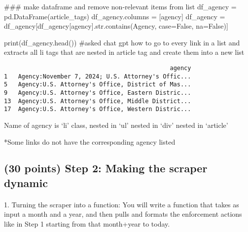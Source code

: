 \documentclass[
  letterpaper,
  DIV=11,
  numbers=noendperiod]{scrartcl}
\makeatletter
\let\oldparagraph\paragraph
\renewcommand{\paragraph}{
    \@ifstar
      \xxxParagraphStar
      \xxxParagraphNoStar
  }
\newcommand{\xxxParagraphStar}[1]{\oldparagraph*{#1}\mbox{}}
\newcommand{\xxxParagraphNoStar}[1]{\oldparagraph{#1}\mbox{}}
\newenvironment{Shaded}{\begin{snugshade}}{\end{snugshade}}
\newcommand{\BuiltInTok}[1]{\textcolor[rgb]{0.00,0.23,0.31}{#1}}
\newcommand{\CommentTok}[1]{\textcolor[rgb]{0.37,0.37,0.37}{#1}}
\newcommand{\NormalTok}[1]{\textcolor[rgb]{0.00,0.23,0.31}{#1}}
\newcommand{\OperatorTok}[1]{\textcolor[rgb]{0.37,0.37,0.37}{#1}}
\newcommand{\StringTok}[1]{\textcolor[rgb]{0.13,0.47,0.30}{#1}}
\newcommand{\VariableTok}[1]{\textcolor[rgb]{0.07,0.07,0.07}{#1}}
\makeatother
\begin{document}
\begin{Shaded}
\begin{Highlighting}[]
\CommentTok{\#\#\# make dataframe and remove non{-}relevant items from list}
\NormalTok{df\_agency }\OperatorTok{=}\NormalTok{ pd.DataFrame(article\_tags)}
\NormalTok{df\_agency.columns }\OperatorTok{=}\NormalTok{ [}\StringTok{\textquotesingle{}agency\textquotesingle{}}\NormalTok{]}
\NormalTok{df\_agency }\OperatorTok{=}\NormalTok{ df\_agency[df\_agency[}\StringTok{\textquotesingle{}agency\textquotesingle{}}\NormalTok{].}\BuiltInTok{str}\NormalTok{.contains(}\StringTok{\textquotesingle{}Agency\textquotesingle{}}\NormalTok{, case}\OperatorTok{=}\VariableTok{False}\NormalTok{, na}\OperatorTok{=}\VariableTok{False}\NormalTok{)]}

\BuiltInTok{print}\NormalTok{(df\_agency.head())}
\CommentTok{\#asked chat gpt \textquotesingle{}how to go to every link in a list and extracts all \textquotesingle{}li\textquotesingle{} tags that are nested in \textquotesingle{}article\textquotesingle{} tag and create them into a new list\textquotesingle{}}
\end{Highlighting}
\end{Shaded}

\begin{verbatim}
                                               agency
1   Agency:November 7, 2024; U.S. Attorney's Offic...
5   Agency:U.S. Attorney's Office, District of Mas...
9   Agency:U.S. Attorney's Office, Eastern Distric...
13  Agency:U.S. Attorney's Office, Middle District...
17  Agency:U.S. Attorney's Office, Western Distric...
\end{verbatim}

Name of agency is `li' class, nested in `ul' nested in `div' nested in
`article'

*Some links do not have the corresponding agency listed

\subsection{(30 points) Step 2: Making the scraper
dynamic}\label{points-step-2-making-the-scraper-dynamic}

\paragraph{1. Turning the scraper into a function: You will write a
function that takes as input a month and a year, and then pulls and
formats the enforcement actions like in Step 1 starting from that
month+year to
today.}\label{turning-the-scraper-into-a-function-you-will-write-a-function-that-takes-as-input-a-month-and-a-year-and-then-pulls-and-formats-the-enforcement-actions-like-in-step-1-starting-from-that-monthyear-to-today.}
\end{document}
